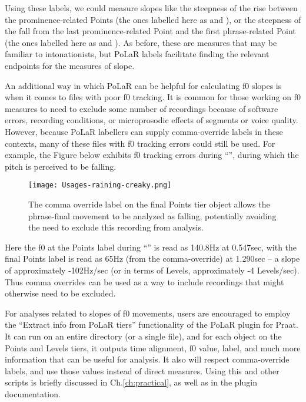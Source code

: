 Using these labels, we could measure slopes like the steepness of the rise between the prominence-related Points (the ones labelled here as \textlabel{*>} and \textlabel{*<}), or the steepness of the fall from the last prominence-related Point and the first phrase-related Point (the ones labelled here as \textlabel{*<} and \textlabel{]>}). As before, these are measures that may be familiar to intonationists, but PoLaR labels facilitate finding the relevant endpoints for the measures of slope.

An additional way in which PoLaR can be helpful for calculating f0 slopes is when it comes to files with poor f0 tracking. It is common for those working on f0 measures to need to exclude some number of recordings because of software errors, recording conditions, or microprosodic effects of segments or voice quality. However, because PoLaR labellers can supply comma-override labels in these contexts, many of these files with f0 tracking errors could still be used. For example, the Figure below exhibits f0 tracking errors during “”, during which the pitch is perceived to be falling.

\begin{figure}[H]
\centering
%
\texttt{[image: Usages-raining-creaky.png]}
%
\caption{The comma override label on the final Points tier object allows the phrase-final movement to be analyzed as falling, potentially avoiding the need to exclude this recording from analysis.%
\label{fig:Usages raining creaky}%
}
\end{figure}

Here the f0 at the Points label during “” is read as 140.8Hz at 0.547sec, with the final Points label is read as 65Hz (from the comma-override) at 1.290sec – a slope of approximately ​​-102Hz/sec (or in terms of Levels, approximately -4 Levels/sec). Thus comma overrides can be used as a way to include recordings that might otherwise need to be excluded.

\begin{infobox}
For analyses related to slopes of f0 movements, users are encouraged to employ the “Extract info from PoLaR tiers” functionality of the PoLaR plugin for Praat. It can run on an entire directory (or a single file), and for each object on the Points and Levels tiers, it outputs time alignment, f0 value, label, and much more information that can be useful for analysis. It also will respect comma-override labels, and use those values instead of direct measures. Using this and other scripts is briefly discussed in Ch.\ref{ch:practical}, as well as in the plugin documentation.	
\end{infobox}


